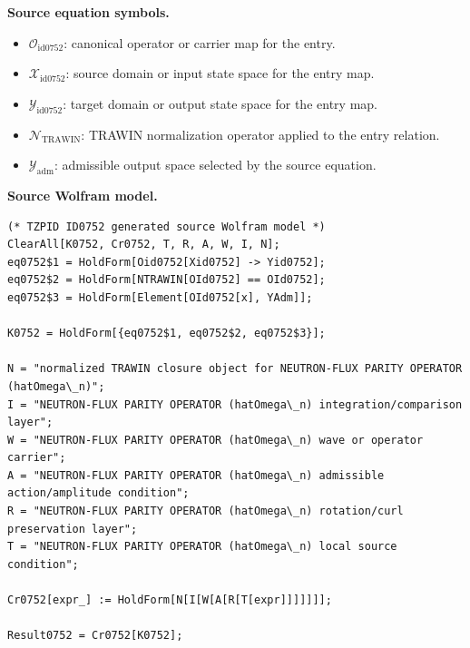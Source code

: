 \begin{minipage}[t]{0.49\linewidth}
\begingroup
\small
\raggedright
\textbf{Source equation symbols.}\par
\begin{itemize}[leftmargin=1.35em,itemsep=1pt,topsep=1pt,parsep=0pt]
    \item $\mathcal{O}_{\mathrm{id0752}}$: canonical operator or carrier map for the entry.
    \item $\mathcal{X}_{\mathrm{id0752}}$: source domain or input state space for the entry map.
    \item $\mathcal{Y}_{\mathrm{id0752}}$: target domain or output state space for the entry map.
    \item $\mathcal{N}_{\mathrm{TRAWIN}}$: TRAWIN normalization operator applied to the entry relation.
    \item $\mathcal{Y}_{\mathrm{adm}}$: admissible output space selected by the source equation.
\end{itemize}
\endgroup
\end{minipage}\hfill
\begin{minipage}[t]{0.47\linewidth}
\begingroup
\scriptsize
\raggedright
\textbf{Source Wolfram model.}\par
\begin{Verbatim}[fontsize=\tiny,breaklines=true,breakanywhere=true]
(* TZPID ID0752 generated source Wolfram model *)
ClearAll[K0752, Cr0752, T, R, A, W, I, N];
eq0752$1 = HoldForm[Oid0752[Xid0752] -> Yid0752];
eq0752$2 = HoldForm[NTRAWIN[OId0752] == OId0752];
eq0752$3 = HoldForm[Element[OId0752[x], YAdm]];

K0752 = HoldForm[{eq0752$1, eq0752$2, eq0752$3}];

N = "normalized TRAWIN closure object for NEUTRON-FLUX PARITY OPERATOR (hatOmega\_n)";
I = "NEUTRON-FLUX PARITY OPERATOR (hatOmega\_n) integration/comparison layer";
W = "NEUTRON-FLUX PARITY OPERATOR (hatOmega\_n) wave or operator carrier";
A = "NEUTRON-FLUX PARITY OPERATOR (hatOmega\_n) admissible action/amplitude condition";
R = "NEUTRON-FLUX PARITY OPERATOR (hatOmega\_n) rotation/curl preservation layer";
T = "NEUTRON-FLUX PARITY OPERATOR (hatOmega\_n) local source condition";

Cr0752[expr_] := HoldForm[N[I[W[A[R[T[expr]]]]]]];

Result0752 = Cr0752[K0752];
\end{Verbatim}
\endgroup
\end{minipage}

